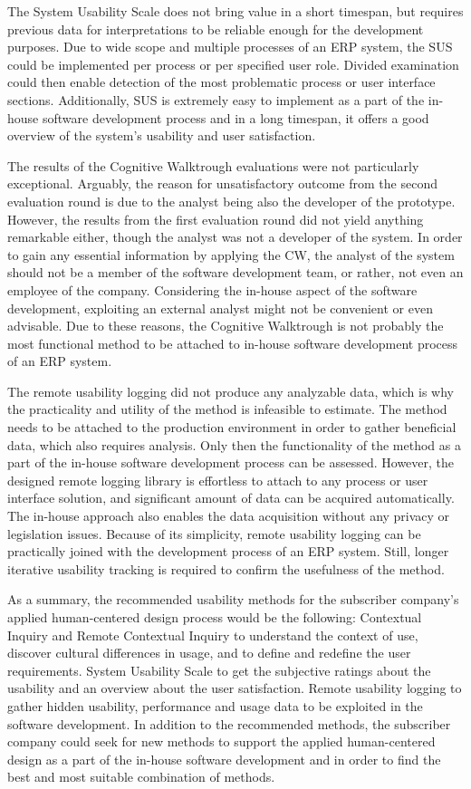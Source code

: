 \documentclass[12pt,a4paper,oneside,pdftex]{report}
\begin{document}
The System Usability Scale does not bring value in a short timespan, but requires previous data for interpretations to be reliable enough for the development purposes. Due to wide scope and multiple processes of an ERP system, the SUS could be implemented per process or per specified user role. Divided examination could then enable detection of the most problematic process or user interface sections. Additionally, SUS is extremely easy to implement as a part of the in-house software development process and in a long timespan, it offers a good overview of the system's usability and user satisfaction. 

The results of the Cognitive Walktrough evaluations were not particularly exceptional. Arguably, the reason for unsatisfactory outcome from the second evaluation round is due to the analyst being also the developer of the prototype. However, the results from the first evaluation round did not yield anything remarkable either, though the analyst was not a developer of the system. In order to gain any essential information by applying the CW, the analyst of the system should not be a member of the software development team, or rather, not even an employee of the company. Considering the in-house aspect of the software development, exploiting an external analyst might not be convenient or even advisable. Due to these reasons, the Cognitive Walktrough is not probably the most functional method to be attached to in-house software development process of an ERP system. 

The remote usability logging did not produce any analyzable data, which is why the practicality and utility of the method is infeasible to estimate. The method needs to be attached to the production environment in order to gather beneficial data, which also requires analysis. Only then the functionality of the method as a part of the in-house software development process can  be assessed. However, the designed remote logging library is effortless to attach to any process or user interface solution, and significant amount of data can be acquired automatically. The in-house approach also enables the data acquisition without any privacy or legislation issues. Because of its simplicity, remote usability logging can be practically joined with the development process of an  ERP system. Still, longer iterative usability tracking is required to confirm the usefulness of the method.

As a summary, the recommended usability methods for the subscriber company's applied human-centered design process would be the following: Contextual Inquiry and Remote Contextual Inquiry to understand the context of use, discover cultural differences in usage, and to define and redefine the user requirements. System Usability Scale to get the subjective ratings about the usability and an overview about the user satisfaction. Remote usability logging to gather hidden usability, performance and usage data to be exploited in the software development. In addition to the recommended methods, the subscriber company could seek for new methods to support the applied human-centered design as a part of the in-house software development and in order to find the best and most suitable combination of methods.
 
\end{document}
